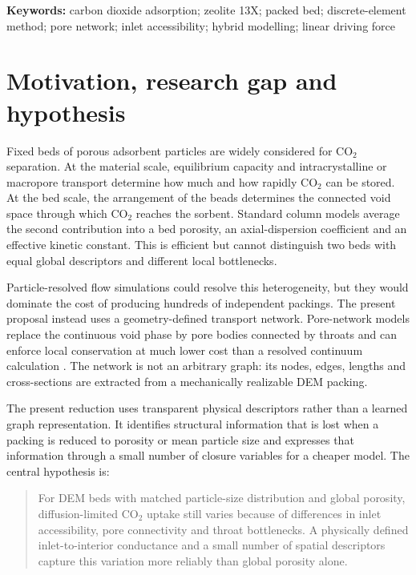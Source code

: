 \documentclass[12pt,a4paper]{article}
\begin{document}
\noindent\textbf{Keywords:} carbon dioxide adsorption; zeolite 13X; packed bed;
discrete-element method; pore network; inlet accessibility; hybrid modelling;
linear driving force

\section{Motivation, research gap and hypothesis}

Fixed beds of porous adsorbent particles are widely considered for CO$_2$
separation. At the material scale, equilibrium capacity and intracrystalline or
macropore transport determine how much and how rapidly CO$_2$ can be stored. At
the bed scale, the arrangement of the beads determines the connected void space
through which CO$_2$ reaches the sorbent. Standard column models average the
second contribution into a bed porosity, an axial-dispersion coefficient and an
effective kinetic constant. This is efficient but cannot distinguish two beds
with equal global descriptors and different local bottlenecks.

Particle-resolved flow simulations could resolve this heterogeneity, but they
would dominate the cost of producing hundreds of independent packings. The
present proposal instead uses a geometry-defined transport network. Pore-network
models replace the continuous void phase by pore bodies connected by throats and
can enforce local conservation at much lower cost than a resolved continuum
calculation \cite{Blunt2017}. The network is not an arbitrary graph: its nodes,
edges, lengths and cross-sections are extracted from a mechanically realizable
DEM packing.

The present reduction uses transparent physical descriptors rather than a
learned graph representation. It identifies structural information that is
lost when a packing is reduced to porosity or mean particle size and expresses
that information through a small number of closure variables for a cheaper
model. The central hypothesis is:

\begin{quote}
For DEM beds with matched particle-size distribution and global porosity,
diffusion-limited CO$_2$ uptake still varies because of differences in inlet
accessibility, pore connectivity and throat bottlenecks. A physically defined
inlet-to-interior conductance and a small number of spatial descriptors capture
this variation more reliably than global porosity alone.
\end{quote}
\end{document}
